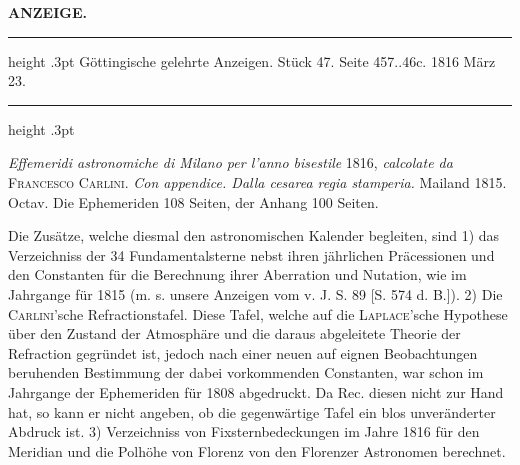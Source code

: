 \clearpage
\thispagestyle{empty}
\noindent{}%
%
\parbox[t]{\dimexpr\linewidth-24mm\relax}{\centering\footnotesize\bfseries ANZEIGE.\par}%
\makebox[12mm][r]{}\par\medskip

\begin{center}
\parbox{.85\linewidth}{%
\centering\small
\hrule height .3pt\relax\vspace{2.5pt}
Göttingische gelehrte Anzeigen. Stück 47. Seite 457..46c. 1816 März 23.\par
\vspace{2.5pt}\hrule height .3pt\relax
}
\end{center}

\emph{Effemeridi astronomiche di Milano per l’anno bisestile} 1816, \emph{calcolate da} \textsc{Francesco Carlini}. \emph{Con appendice. Dalla cesarea regia stamperia.} Mailand 1815. Octav. Die Ephemeriden 108 Seiten, der Anhang 100 Seiten.

Die Zusätze, welche diesmal den astronomischen Kalender begleiten, sind 1) das Verzeichniss der 34 Fundamentalsterne nebst ihren jährlichen Präcessionen und den Constanten für die Berechnung ihrer Aberration und Nutation, wie im Jahrgange für 1815 (m. s. unsere Anzeigen vom v. J. S. 89 [S. 574 d. B.]). 2) Die \textsc{Carlini}'sche Refractionstafel. Diese Tafel, welche auf die \textsc{Laplace}'sche Hypothese über den Zustand der Atmosphäre und die daraus abgeleitete Theorie der Refraction gegründet ist, jedoch nach einer neuen auf eignen Beobachtungen beruhenden Bestimmung der dabei vorkommenden Constanten, war schon im Jahrgange der Ephemeriden für 1808 abgedruckt. Da Rec. diesen nicht zur Hand hat, so kann er nicht angeben, ob die gegenwärtige Tafel ein blos unveränderter Abdruck ist. 3) Verzeichniss von Fixsternbedeckungen im Jahre 1816 für den Meridian und die Polhöhe von Florenz von den Florenzer Astronomen berechnet.

